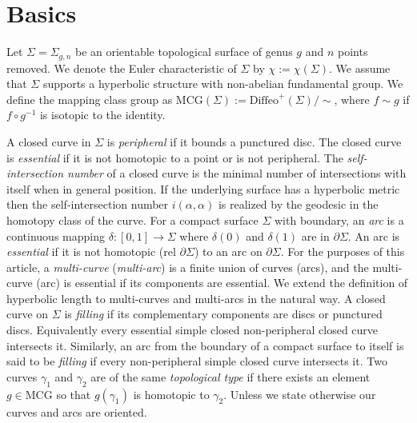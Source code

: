 \documentclass[12pt]{amsart}
\numberwithin{equation}{section}
\theoremstyle{plain}
\begin{document}
 
 
 
 
 
 

 
 

\section{Basics} \label{sec: Basics}



Let $\Sigma=\Sigma_{g,n}$ be an orientable topological surface 
of genus $g$ and $n$ points removed. We denote the Euler characteristic of $\Sigma$ by 
$\chi :=\chi (\Sigma)$. We assume that 
$\Sigma$ supports a hyperbolic structure with non-abelian  
fundamental group. We define the mapping class group as
 $\text{MCG}(\Sigma):=\text{Diffeo}^{+} (\Sigma)/\sim$, where
 $f \sim g$ if $f \circ g^{-1}$  is isotopic to the identity.  
 
 
 \vskip10pt
\vskip10pt
 
A closed curve  in $\Sigma$ is {\it peripheral}  if it bounds a punctured disc. The closed curve is {\it essential} if it is not homotopic to a point or is not peripheral. The {\it self-intersection number}  of a closed curve is the minimal number of intersections with itself  when in general position. If the underlying surface has a hyperbolic metric then the self-intersection number 
$i(\alpha, \alpha)$ is realized by the geodesic in the homotopy class of the curve. For a compact surface $\Sigma$ with boundary,  an {\it arc} is a 
 continuous mapping $\delta : [0,1] \rightarrow \Sigma$
where $\delta (0)$ and $\delta (1)$ are in $\partial \Sigma$.
An arc is {\it essential} if it is not homotopic 
(rel $\partial \Sigma$) to an arc on $\partial \Sigma$. 
For the purposes of this article, a {\it multi-curve}  ({\it multi-arc}) is a finite union  of curves (arcs), and the multi-curve (arc) is essential if its components are essential. We extend the definition of hyperbolic length to multi-curves and multi-arcs in the natural way.  A closed curve on 
$\Sigma$  is 
 {\it filling} if its complementary components are discs or punctured discs.  Equivalently every essential simple closed non-peripheral closed curve intersects it.  Similarly, an arc from the boundary of a compact surface to itself is said to be {\it filling} if every non-peripheral simple closed curve intersects it. Two curves 
 $\gamma_1$ and $\gamma_2$ are of the same {\it topological type}  if there exists an element  $g \in \text{MCG}$ so that $g(\gamma_1)$ is homotopic
 to $\gamma_2$. Unless we state otherwise our curves and arcs are  oriented.    
 
\end{document}
